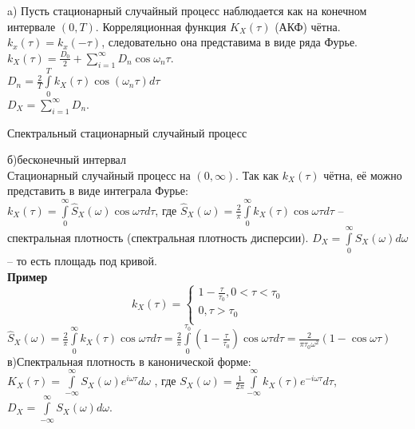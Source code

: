 \documentclass[russian, 12pt, fleqn]{article}
\begin{document}
a) Пусть стационарный случайный процесс наблюдается как на конечном интервале $(0, T)$. Корреляционная функция $K_X(\tau)$ (АКФ) чётна. $k_x(\tau) = k_x(-\tau)$, следовательно она представима в виде ряда Фурье.\\ $k_X(\tau) = \frac{D_0}{2} +  \displaystyle{\sum \limits_{i = 1}^{\infty}} D_n \cos \omega_n \tau$.\\
$D_n = \frac{2}{T} \displaystyle{\int \limits _{0} ^ {T}} k_X (\tau) \cos(\omega_n \tau) d\tau$\\
$D_X =   \displaystyle{\sum \limits_{i = 1}^{\infty}} D_n$.
\begin{center}
$\textbf{Спектральный стационарный случайный процесс}$
\end{center}
б)бесконечный интервал\\
Стационарный случайный процесс на $(0, \infty)$. Так как $k_X(\tau)$ чётна, её можно представить в виде интеграла Фурье:\\
$k_X(\tau) = \displaystyle{\int \limits_{0}^{\infty}} \hat{S}_X(\omega) \cos \omega \tau d\tau$, где $\hat{S}_X (\omega) = \frac{2}{\pi}  \displaystyle{\int \limits_{0}^{\infty}} k_X(\tau) \cos \omega \tau d\tau$ -- спектральная плотность (спектральная плотность дисперсии). $D_X =  \displaystyle{\int \limits_{0}^{\infty}} S_X(\omega) d\omega$ -- то есть площадь под кривой.\\
  \textbf{Пример}\\ 
\begin{equation*} 
k_X(\tau)=
 \begin{cases}
   1 - \frac{\tau}{\tau_0}, 0 < \tau < \tau_0 \\
   0 , \tau > \tau_0\\
 \end{cases}
\end{equation*}
$\hat{S}_X(\omega)  = \frac{2}{\pi} \displaystyle{\int \limits_{0}^{\infty}}k_X(\tau) \cos \omega \tau d\tau = \frac{2}{\pi}\displaystyle{\int \limits_{0}^{\tau_0}} (1 - \frac{\tau}{\tau_0}) \cos \omega \tau d \tau = \frac{2}{\pi \tau_0 \omega^2} (1 - \cos \omega \tau)$\\
в)Спектральная плотность в канонической форме:\\
$K_X(\tau) = \displaystyle{\int \limits_{-\infty}^{\infty}} S_X(\omega)e^{i\omega \tau} d\omega$ , где $S_X(\omega) = \frac{1}{2\pi} \displaystyle{\int \limits_{-\infty}^{\infty}} k_X(\tau) e^{-i\omega \tau} d\tau$, $D_X = \displaystyle{\int \limits_{-\infty}^{\infty}} S_X(\omega) d \omega$.\\
\end{document}
